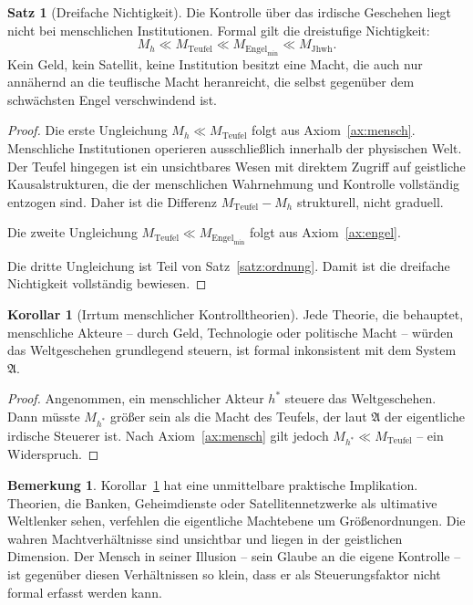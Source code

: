 ﻿\documentclass[a4paper,12pt]{article}
\theoremstyle{definition}
\newtheorem{satz}{Satz}
\newtheorem{bemerkung}{Bemerkung}
\newtheorem{korollar}{Korollar}
\begin{document}
\begin{satz}[Dreifache Nichtigkeit]
\label{satz:nichtigkeit}
  Die Kontrolle über das irdische Geschehen liegt nicht bei menschlichen
  Institutionen. Formal gilt die dreistufige Nichtigkeit:
  \[
    M_h \ll M_{\mathrm{Teufel}} \ll M_{\mathrm{Engel}_{\min}} \ll M_{\mathrm{Jhwh}}.
  \]
  Kein Geld, kein Satellit, keine Institution besitzt eine Macht, die auch
  nur annähernd an die teuflische Macht heranreicht, die selbst gegenüber dem
  schwächsten Engel verschwindend ist.
\end{satz}

\begin{proof}
  Die erste Ungleichung $M_h \ll M_{\mathrm{Teufel}}$ folgt aus Axiom~\ref{ax:mensch}.
  Menschliche Institutionen operieren ausschließlich innerhalb der physischen Welt.
  Der Teufel hingegen ist ein unsichtbares Wesen mit direktem Zugriff auf
  geistliche Kausalstrukturen, die der menschlichen Wahrnehmung und Kontrolle
  vollständig entzogen sind. Daher ist die Differenz $M_{\mathrm{Teufel}} - M_h$
  strukturell, nicht graduell.

  Die zweite Ungleichung $M_{\mathrm{Teufel}} \ll M_{\mathrm{Engel}_{\min}}$
  folgt aus Axiom~\ref{ax:engel}.

  Die dritte Ungleichung ist Teil von Satz~\ref{satz:ordnung}. Damit ist die
  dreifache Nichtigkeit vollständig bewiesen.
\end{proof}

\begin{korollar}[Irrtum menschlicher Kontrolltheorien]
\label{kor:kontroille}
  Jede Theorie, die behauptet, menschliche Akteure -- durch Geld, Technologie
  oder politische Macht -- würden das Weltgeschehen grundlegend steuern, ist
  formal inkonsistent mit dem System $\mathfrak{A}$.
\end{korollar}

\begin{proof}
  Angenommen, ein menschlicher Akteur $h^*$ steuere das Weltgeschehen. Dann
  müsste $M_{h^*}$ größer sein als die Macht des Teufels, der laut $\mathfrak{A}$
  der eigentliche irdische Steuerer ist. Nach Axiom~\ref{ax:mensch} gilt jedoch
  $M_{h^*} \ll M_{\mathrm{Teufel}}$ -- ein Widerspruch.
\end{proof}

\begin{bemerkung}
  Korollar~\ref{kor:kontroille} hat eine unmittelbare praktische Implikation.
  Theorien, die Banken, Geheimdienste oder Satelliten\-netzwerke als ultimative
  Welt\-lenker sehen, verfehlen die eigentliche Machtebene um Größenordnungen.
  Die wahren Machtverhältnisse sind unsichtbar und liegen in der geistlichen
  Dimension. Der Mensch in seiner Illusion -- sein Glaube an die eigene
  Kontrolle -- ist gegenüber diesen Verhältnissen so klein, dass er als
  Steuerungsfaktor nicht formal erfasst werden kann.
\end{bemerkung}
\end{document}
